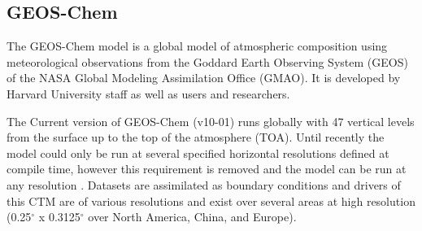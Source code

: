 \subsection{GEOS-Chem}
The GEOS-Chem model is a global model of atmospheric composition using meteorological observations from the Goddard Earth Observing System (GEOS) of the NASA Global Modeling Assimilation Office (GMAO). It is developed by Harvard University staff as well as users and researchers. 

The Current version of GEOS-Chem (v10-01) runs globally with 47 vertical levels from the surface up to the top of the atmosphere (TOA). 
Until recently the model could only be run at several specified horizontal resolutions defined at compile time, however this requirement is removed and the model can be run at any resolution \cite{Long_2015}.
Datasets are assimilated as boundary conditions and drivers of this CTM are of various resolutions and exist over several areas at high resolution (0.25$^{\circ}$ x 0.3125$^{\circ}$ over North America, China, and Europe).






  
  
  